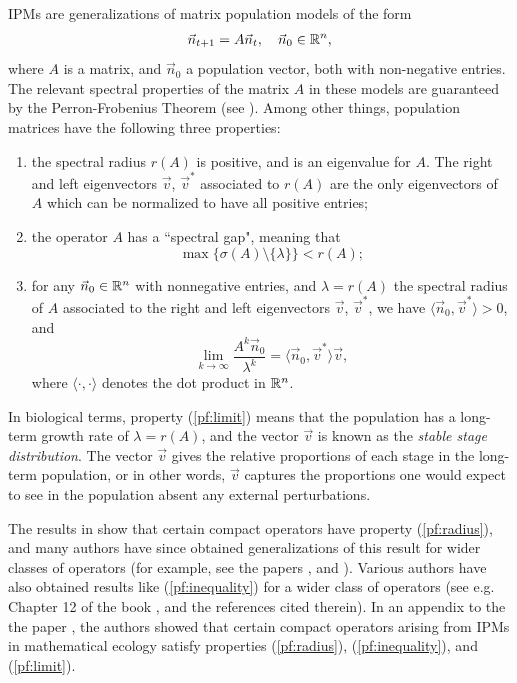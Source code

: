 IPMs are generalizations of matrix population models of the form
\begin{align}
	\vec{n}_{t+1} = A \vec{n}_t, \quad \vec{n}_0 \in \mathbb{R}^n, \label{eqn:system}
\end{align}
where $A$ is a matrix, and $\vec{n}_0$ a population vector, both with non-negative entries. The relevant spectral properties of the matrix $A$ in these models are guaranteed by the Perron-Frobenius Theorem (see \cite{Caswell2001}). Among other things, population matrices have the following three properties:
\begin{enumerate}
	\item \label{pf:radius} the spectral radius $r(A)$ is positive, and is an eigenvalue for $A$. The right and left eigenvectors $\vec{v}$, $\vec{v}^*$ associated to $r(A)$ are the only eigenvectors of $A$ which can be normalized to have all positive entries;
	\item \label{pf:inequality} the operator $A$ has a ``spectral gap", meaning that
	\[\max\{\sigma(A) \setminus \{\lambda\}\} < r(A);\]
	\item \label{pf:limit} for any $\vec{n}_0 \in \mathbb{R}^n$ with nonnegative entries, and $\lambda=r(A)$ the spectral radius of $A$ associated to the right and left eigenvectors $\vec{v}$, $\vec{v}^*$, we have $ \langle \vec{n}_0, \vec{v}^* \rangle > 0$, and 
	\[\lim_{k \to \infty} \frac{A^k \vec{n}_0}{\lambda^k} = \langle \vec{n}_0, \vec{v}^* \rangle \vec{v},\]
	where $\langle \cdot, \cdot \rangle$ denotes the dot product in $\mathbb{R}^n$.
\end{enumerate}

In biological terms, property (\ref{pf:limit}) means that the population has a long-term growth rate of $\lambda = r(A)$, and the vector $\vec{v}$ is known as the \emph{stable stage distribution}. The vector $\vec{v}$ gives the relative proportions of each stage in the long-term population, or in other words, $\vec{v}$ captures the proportions one would expect to see in the population absent any external perturbations.

The results in \cite{Krein1950} show that certain compact operators have property (\ref{pf:radius}), and many authors have since obtained generalizations of this result for wider classes of operators (for example, see the papers \cite{Anselone1974, Bonsall1958, Edmunds1972, Karlin1959, Kras1989, Lubben2009, Marek1967, Marek1970, Raghavan1965}, and \cite{Schaefer1960}). Various authors have also obtained results like (\ref{pf:inequality}) for a wider class of operators (see e.g. Chapter 12 of the book \cite{Kras1989}, and the references cited therein). In an appendix to the the paper \cite{Ellner2006}, the authors showed that certain compact operators arising from IPMs in mathematical ecology satisfy properties (\ref{pf:radius}), (\ref{pf:inequality}), and (\ref{pf:limit}).

